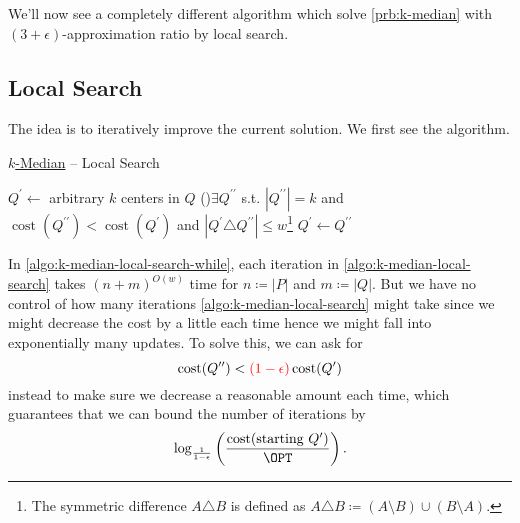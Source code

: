 We'll now see a completely different algorithm which solve \autoref{prb:k-median} with \((3 + \epsilon )\)-approximation ratio by local search.
\subsection{Local Search}
The idea is to iteratively improve the current solution. We first see the algorithm.

\begin{algorithm}[H]\label{algo:k-median-local-search}
	\DontPrintSemicolon
	\caption{\hyperref[prb:k-median]{\(k\)-Median} -- Local Search}
	\BlankLine

	\(Q^\prime \gets \) arbitrary \(k\) centers in \(Q\)\;
	\While(\label{algo:k-median-local-search-while}){\(\exists Q^{\prime\prime}\) s.t. \(\left\vert Q^{\prime\prime} \right\vert = k \) and \(\mathop{\mathrm{cost}}(Q^{\prime\prime}) < \mathop{\mathrm{cost}}(Q^\prime )\) and \(\left\vert Q^\prime \triangle Q^{\prime\prime} \right\vert \leq w\)\footnote{The symmetric difference \(A \triangle B\) is defined as \(A \triangle B \coloneqq (A \setminus B) \cup (B\setminus A)\).}}{
		\(Q^\prime \gets Q^{\prime\prime}\)\;
	}
	\;
\end{algorithm}

\begin{remark}[Runtime]
	In \autoref{algo:k-median-local-search-while}, each iteration in \autoref{algo:k-median-local-search} takes \((n+m)^{O(w)}\) time for \(n \coloneqq \left\vert P \right\vert \) and \(m \coloneqq \left\vert Q \right\vert \). But we have no control of how many iterations \autoref{algo:k-median-local-search} might take since we might decrease the cost by a little each time hence we might fall into exponentially many updates. To solve this, we can ask for
	\[
		\mathop{\mathrm{cost}}(Q^{\prime\prime}) < \mathcolor{red}{(1 - \epsilon )}\mathop{\mathrm{cost}}(Q^\prime )
	\]
	instead to make sure we decrease a reasonable amount each time, which guarantees that we can bound the number of iterations by
	\[
		\log_\frac{1}{1-\epsilon } \left( \frac{\mathop{\mathrm{cost}}(\text{starting } Q^\prime )}{\OPT} \right).
	\]
\end{remark}


